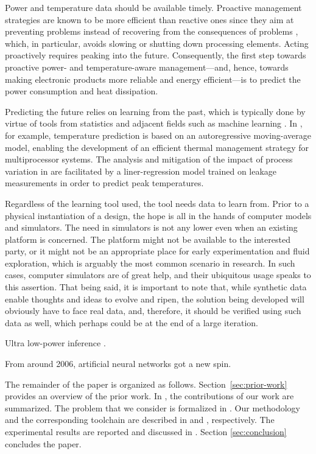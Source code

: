 Power and temperature data should be available timely. Proactive management
strategies are known to be more efficient than reactive ones since they aim at
preventing problems instead of recovering from the consequences of problems
\cite{coskun2008, chaudhry2015}, which, in particular, avoids slowing or
shutting down processing elements. Acting proactively requires peaking into the
future. Consequently, the first step towards proactive power- and
temperature-aware management---and, hence, towards making electronic products
more reliable and energy efficient---is to predict the power consumption and
heat dissipation.

Predicting the future relies on learning from the past, which is typically done
by virtue of tools from statistics and adjacent fields such as machine learning
\cite{bishop2006}. In \cite{coskun2008}, for example, temperature prediction is
based on an autoregressive moving-average model, enabling the development of an
efficient thermal management strategy for multiprocessor systems. The analysis
and mitigation of the impact of process variation in \cite{juan2014} are
facilitated by a liner-regression model trained on leakage measurements in order
to predict peak temperatures.

Regardless of the learning tool used, the tool needs data to learn from. Prior
to a physical instantiation of a design, the hope is all in the hands of
computer models and simulators. The need in simulators is not any lower even
when an existing platform is concerned. The platform might not be available to
the interested party, or it might not be an appropriate place for early
experimentation and fluid exploration, which is arguably the most common
scenario in research. In such cases, computer simulators are of great help, and
their ubiquitous usage speaks to this assertion. That being said, it is
important to note that, while synthetic data enable thoughts and ideas to evolve
and ripen, the solution being developed will obviously have to face real data,
and, therefore, it should be verified using such data as well, which perhaps
could be at the end of a large iteration.

Ultra low-power inference \cite{park2015}.

From around 2006, artificial neural networks got a new spin.

The remainder of the paper is organized as follows. Section~\ref{sec:prior-work}
provides an overview of the prior work. In , the
contributions of our work are summarized. The problem that we consider is
formalized in . Our methodology and the corresponding
toolchain are described in  and ,
respectively. The experimental results are reported and discussed in
. Section \ref{sec:conclusion} concludes the paper.

